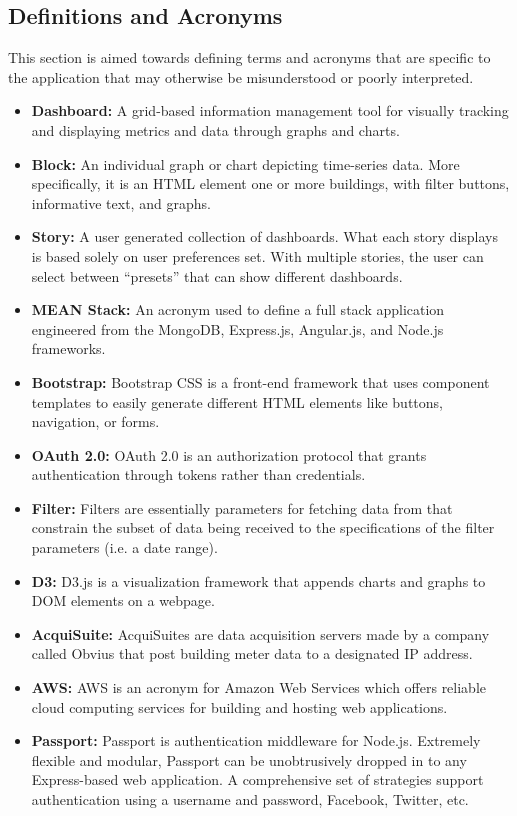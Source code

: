 \documentclass[journal,10pt,onecolumn,compsoc]{IEEEtran}
\begin{document}
    \subsection{Definitions and Acronyms}
    This section is aimed towards defining terms and acronyms that are specific to the application that may otherwise be misunderstood or poorly interpreted.
    \begin{itemize}
        \item \textbf{Dashboard:}
            A grid-based information management tool for visually tracking and displaying metrics and data through graphs and charts.
        \item \textbf{Block:} 
            An individual graph or chart depicting time-series data. More specifically, it is an HTML element one or more buildings, with filter buttons, informative text, and graphs.
        \item \textbf{Story:} 
            A user generated collection of dashboards. What each story displays is based solely on user preferences set. With multiple stories, the user can select between ``presets'' that can show different dashboards.
        \item \textbf{MEAN Stack:} 
            An acronym used to define a full stack application engineered from the MongoDB, Express.js, Angular.js, and Node.js frameworks. 
        \item \textbf{Bootstrap:} 
            Bootstrap CSS is a front-end framework that uses component templates to easily generate different HTML elements like buttons, navigation, or forms. 
        \item \textbf{OAuth 2.0:} 
            OAuth 2.0 is an authorization protocol that grants authentication through tokens rather than credentials. 
        \item \textbf{Filter:} 
            Filters are essentially parameters for fetching data from that constrain the subset of data being received to the specifications of the filter parameters (i.e. a date range). 
        \item \textbf{D3:} 
            D3.js is a visualization framework that appends charts and graphs to DOM elements on a webpage. 
        \item \textbf{AcquiSuite:} 
            AcquiSuites are data acquisition servers made by a company called Obvius that post building meter data to a designated IP address.
        \item \textbf{AWS:} 
            AWS is an acronym for Amazon Web Services which offers reliable cloud computing services for building and hosting web applications.
	   \item \textbf{Passport:} 
			Passport is authentication middleware for Node.js. Extremely flexible and modular, Passport can be unobtrusively dropped in to any Express-based web application. A comprehensive set of strategies support authentication using a username and password, Facebook, Twitter, etc.
   \end{itemize}
\end{document}
